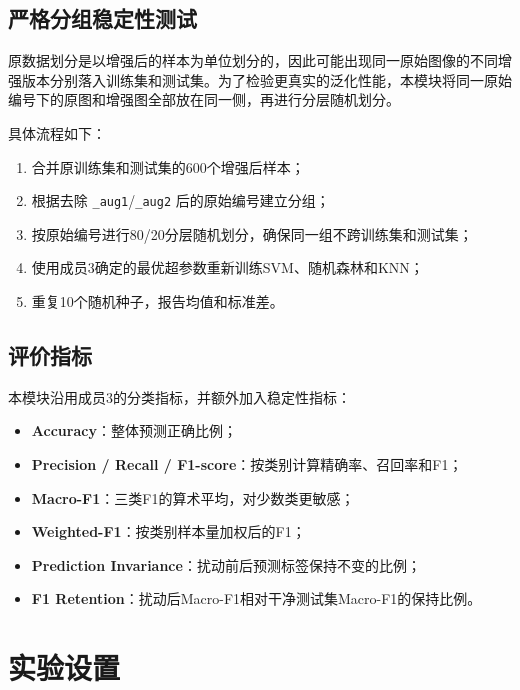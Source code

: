 \documentclass[12pt,a4paper]{ctexart}
\begin{document}
\subsection{严格分组稳定性测试}
原数据划分是以增强后的样本为单位划分的，因此可能出现同一原始图像的不同增强版本分别落入训练集和测试集。为了检验更真实的泛化性能，本模块将同一原始编号下的原图和增强图全部放在同一侧，再进行分层随机划分。

具体流程如下：
\begin{enumerate}[label=(\arabic*)]
    \item 合并原训练集和测试集的600个增强后样本；
    \item 根据去除 \texttt{\_aug1}/\texttt{\_aug2} 后的原始编号建立分组；
    \item 按原始编号进行80/20分层随机划分，确保同一组不跨训练集和测试集；
    \item 使用成员3确定的最优超参数重新训练SVM、随机森林和KNN；
    \item 重复10个随机种子，报告均值和标准差。
\end{enumerate}

\subsection{评价指标}
本模块沿用成员3的分类指标，并额外加入稳定性指标：
\begin{itemize}
    \item \textbf{Accuracy}：整体预测正确比例；
    \item \textbf{Precision / Recall / F1-score}：按类别计算精确率、召回率和F1；
    \item \textbf{Macro-F1}：三类F1的算术平均，对少数类更敏感；
    \item \textbf{Weighted-F1}：按类别样本量加权后的F1；
    \item \textbf{Prediction Invariance}：扰动前后预测标签保持不变的比例；
    \item \textbf{F1 Retention}：扰动后Macro-F1相对干净测试集Macro-F1的保持比例。
\end{itemize}

\section{实验设置}
\end{document}
